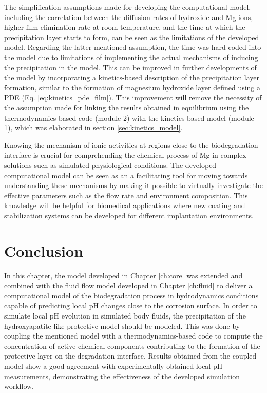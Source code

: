 The simplification assumptions made for developing the computational model, including the correlation between the diffusion rates of hydroxide and Mg ions, higher film elimination rate at room temperature, and the time at which the precipitation layer starts to form,  can be seen as the limitations of the developed model. Regarding the latter mentioned assumption, the time was hard-coded into the model due to limitations of implementing the actual mechanisms of inducing the precipitation in the model. This can be improved in further developments of the model by incorporating a kinetics-based description of the precipitation layer formation, similar to the formation of magnesium hydroxide layer defined using a PDE (Eq. \ref{eq:kinetics_pde_film}). This improvement will remove the necessity of the assumption made for linking the results obtained in equilibrium using the thermodynamics-based code (module 2) with the kinetics-based model (module 1), which was elaborated in section \ref{sec:kinetics_model}.

Knowing the mechanism of ionic activities at regions close to the biodegradation interface is crucial for comprehending the chemical process of Mg in complex solutions such as simulated physiological conditions. The developed computational model can be seen as an a facilitating tool for moving towards understanding these mechanisms by making it possible to virtually investigate the effective parameters such as the flow rate and environment composition. This knowledge will be helpful for biomedical applications where new coating and stabilization systems can be developed for different implantation environments.

\section{Conclusion}

In this chapter, the model developed in Chapter \ref{ch:core} was extended and combined with the fluid flow model developed in Chapter \ref{ch:fluid} to deliver a computational model of the biodegradation process in hydrodynamics conditions capable of predicting local pH changes close to the corrosion surface. In order to simulate local pH evolution in simulated body fluids, the precipitation of the hydroxyapatite-like protective model should be modeled. This was done by coupling the mentioned model with a thermodynamics-based code to compute the concentration of active chemical components contributing to the formation of the protective layer on the degradation interface. Results obtained from the coupled model show a good agreement with experimentally-obtained local pH measurements, demonstrating the effectiveness of the developed simulation workflow.

